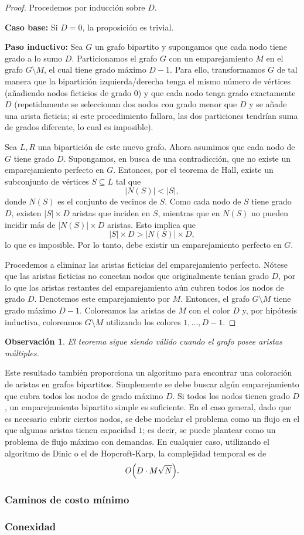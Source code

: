 \documentclass[a4paper]{article}
\newtheorem*{remark}{Observación}
\begin{document}
\begin{proof}
Procedemos por inducción sobre $D$.

\textbf{Caso base:} Si $D=0$, la proposición es trivial.

\textbf{Paso inductivo:} Sea $G$ un grafo bipartito y supongamos que cada nodo tiene grado a lo sumo $D$. Particionamos el grafo $G$ con un emparejamiento $M$ en el grafo $G\setminus M$, el cual tiene grado máximo $D-1$. Para ello, transformamos $G$ de tal manera que la bipartición izquierda/derecha tenga el mismo número de vértices (añadiendo nodos ficticios de grado $0$) y que cada nodo tenga grado exactamente $D$ (repetidamente se seleccionan dos nodos con grado menor que $D$ y se añade una arista ficticia; si este procedimiento fallara, las dos particiones tendrían suma de grados diferente, lo cual es imposible).

Sea $L,R$ una bipartición de este nuevo grafo. Ahora asumimos que cada nodo de $G$ tiene grado $D$. Supongamos, en busca de una contradicción, que no existe un emparejamiento perfecto en $G$. Entonces, por el teorema de Hall, existe un subconjunto de vértices $S\subseteq L$ tal que
\[
|N(S)| < |S|,
\]
donde $N(S)$ es el conjunto de vecinos de $S$. Como cada nodo de $S$ tiene grado $D$, existen $|S|\times D$ aristas que inciden en $S$, mientras que en $N(S)$ no pueden incidir más de $|N(S)|\times D$ aristas. Esto implica que
\[
|S|\times D > |N(S)|\times D,
\]
lo que es imposible. Por lo tanto, debe existir un emparejamiento perfecto en $G$.

Procedemos a eliminar las aristas ficticias del emparejamiento perfecto. Nótese que las aristas ficticias no conectan nodos que originalmente tenían grado $D$, por lo que las aristas restantes del emparejamiento aún cubren todos los nodos de grado $D$. Denotemos este emparejamiento por $M$. Entonces, el grafo $G\setminus M$ tiene grado máximo $D-1$. Coloreamos las aristas de $M$ con el color $D$ y, por hipótesis inductiva, coloreamos $G\setminus M$ utilizando los colores $1,\dots, D-1$.
\end{proof}

\begin{remark}
El teorema sigue siendo válido cuando el grafo posee aristas múltiples.
\end{remark}

Este resultado también proporciona un algoritmo para encontrar una coloración de aristas en grafos bipartitos. Simplemente se debe buscar algún emparejamiento que cubra todos los nodos de grado máximo $D$. Si todos los nodos tienen grado $D$, un emparejamiento bipartito simple es suficiente. En el caso general, dado que es necesario cubrir ciertos nodos, se debe modelar el problema como un flujo en el que algunas aristas tienen capacidad $1$; es decir, se puede plantear como un problema de flujo máximo con demandas. En cualquier caso, utilizando el algoritmo de Dinic o el de Hopcroft-Karp, la complejidad temporal es de
\[
O\Bigl(D\cdot M \sqrt{N}\Bigr).
\]

\subsubsection{Caminos de costo m\'inimo}

\subsubsection{Conexidad}
\end{document}
